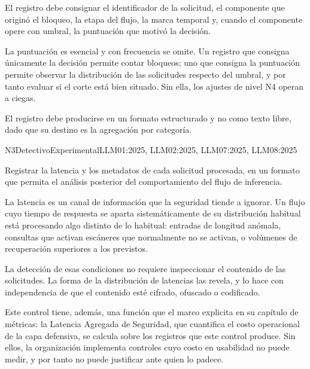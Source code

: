 El registro debe consignar el identificador de la solicitud, el componente que originó el bloqueo, la etapa del flujo, la marca temporal y, cuando el componente opere con umbral, la puntuación que motivó la decisión.

La puntuación es esencial y con frecuencia se omite. Un registro que consigna únicamente la decisión permite contar bloqueos; uno que consigna la puntuación permite observar la distribución de las solicitudes respecto del umbral, y por tanto evaluar si el corte está bien situado. Sin ella, los ajustes de nivel N4 operan a ciegas.

El registro debe producirse en un formato estructurado y no como texto libre, dado que su destino es la agregación por categoría.


  {N3}{Detectivo}{Experimental}{LLM01:2025, LLM02:2025, LLM07:2025, LLM08:2025}

Registrar la latencia y los metadatos de cada solicitud procesada, en un formato que permita el análisis posterior del comportamiento del flujo de inferencia.

La latencia es un canal de información que la seguridad tiende a ignorar. Un flujo cuyo tiempo de respuesta se aparta sistemáticamente de su distribución habitual está procesando algo distinto de lo habitual: entradas de longitud anómala, consultas que activan escáneres que normalmente no se activan, o volúmenes de recuperación superiores a los previstos.

La detección de esas condiciones no requiere inspeccionar el contenido de las solicitudes. La forma de la distribución de latencias las revela, y lo hace con independencia de que el contenido esté cifrado, ofuscado o codificado.

Este control tiene, además, una función que el marco explicita en su capítulo de métricas: la Latencia Agregada de Seguridad, que cuantifica el costo operacional de la capa defensiva, se calcula sobre los registros que este control produce. Sin ellos, la organización implementa controles cuyo costo en usabilidad no puede medir, y por tanto no puede justificar ante quien lo padece.

